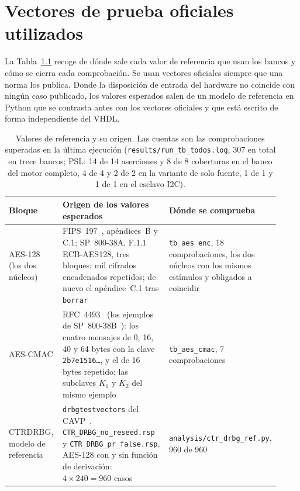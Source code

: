 \chapter{Vectores de prueba oficiales utilizados}
\label{app:vectors}

La Tabla~\ref{tab:app_vectors} recoge de dónde sale cada valor de
referencia que usan los bancos y cómo se cierra cada comprobación. Se usan
vectores oficiales siempre que una norma los publica. Donde la
disposición de entrada del hardware no coincide con ningún caso publicado,
los valores esperados salen de un modelo de referencia en Python que se
contrasta antes con los vectores oficiales y que está escrito de forma
independiente del \ac{VHDL}.

\begin{table}[htbp]
\centering\small
\caption{Valores de referencia y su origen. Las cuentas son las
comprobaciones superadas en la última ejecución
(\nolinkurl{results/run_tb_todos.log}, 307 en total en trece bancos;
\acs{PSL}: 14 de 14 aserciones y 8 de 8 coberturas en el banco del motor
completo, 4 de 4 y 2 de 2 en la variante de solo fuente, 1 de 1 y 1 de 1
en el esclavo \acs{I2C}).}
\label{tab:app_vectors}
\footnotesize
\begin{tabular}{@{}>{\raggedright\arraybackslash}p{0.2\linewidth}>{\raggedright\arraybackslash}p{0.4\linewidth}>{\raggedright\arraybackslash}p{0.32\linewidth}@{}}
\toprule
Bloque & Origen de los valores esperados & Dónde se comprueba \\
\midrule
\ac{AES}-128 (los dos núcleos) & FIPS~197~\cite{nist_2023_fips197},
  apéndices~B y C.1; SP~800-38A, F.1.1 ECB-AES128, tres bloques; mil
  cifrados encadenados repetidos; de nuevo el apéndice~C.1 tras
  \texttt{borrar} & \texttt{tb\_aes\_enc}, 18 comprobaciones, los dos
  núcleos con los mismos estímulos y obligados a coincidir \\
\ac{AES}-\ac{CMAC} & RFC~4493~\cite{song_2006_rfc4493} (los ejemplos de
  SP~800-38B~\cite{nist_2016_sp80038b}): los cuatro mensajes de 0, 16, 40
  y 64 bytes con la clave \texttt{2b7e1516\ldots}, y el de 16 bytes
  repetido; las subclaves $K_1$ y $K_2$ del mismo ejemplo & \texttt{tb\_aes\_cmac}, 7 comprobaciones \\
\ac{CTRDRBG}, modelo de referencia &
  \texttt{drbgtestvectors} del \ac{CAVP}~\cite{nist_cavp_drbg},
  \texttt{CTR\_DRBG\_no\_reseed.rsp} y \texttt{CTR\_DRBG\_pr\_false.rsp},
  AES-128 con y sin función de derivación: $4 \times 240 = 960$ casos &
  \nolinkurl{analysis/ctr_drbg_ref.py}, 960 de 960 \\

\end{tabular}
\end{table}
